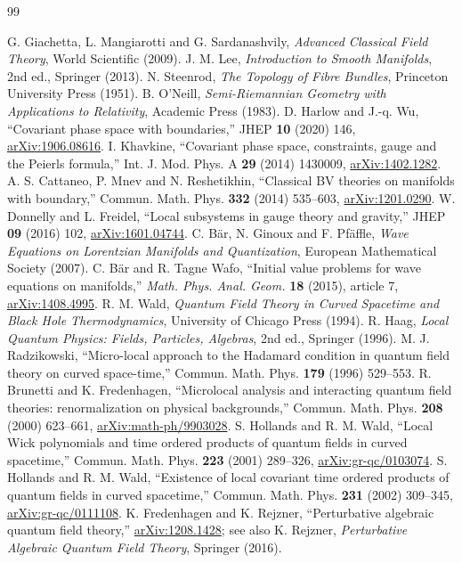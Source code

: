 \renewcommand{\bibname}{References}
\begin{thebibliography}{99}
 G. Giachetta, L. Mangiarotti and G. Sardanashvily, \emph{Advanced Classical Field Theory}, World Scientific (2009).
 J. M. Lee, \emph{Introduction to Smooth Manifolds}, 2nd ed., Springer (2013).
 N. Steenrod, \emph{The Topology of Fibre Bundles}, Princeton University Press (1951).
 B. O'Neill, \emph{Semi-Riemannian Geometry with Applications to Relativity}, Academic Press (1983).
 D. Harlow and J.-q. Wu, ``Covariant phase space with boundaries,'' JHEP \textbf{10} (2020) 146, \href{https://arxiv.org/abs/1906.08616}{arXiv:1906.08616}.
 I. Khavkine, ``Covariant phase space, constraints, gauge and the Peierls formula,'' Int. J. Mod. Phys. A \textbf{29} (2014) 1430009, \href{https://arxiv.org/abs/1402.1282}{arXiv:1402.1282}.
 A. S. Cattaneo, P. Mnev and N. Reshetikhin, ``Classical BV theories on manifolds with boundary,'' Commun. Math. Phys. \textbf{332} (2014) 535--603, \href{https://arxiv.org/abs/1201.0290}{arXiv:1201.0290}.
 W. Donnelly and L. Freidel, ``Local subsystems in gauge theory and gravity,'' JHEP \textbf{09} (2016) 102, \href{https://arxiv.org/abs/1601.04744}{arXiv:1601.04744}.
 C. B\"ar, N. Ginoux and F. Pf\"affle, \emph{Wave Equations on Lorentzian Manifolds and Quantization}, European Mathematical Society (2007).
 C. B\"ar and R. Tagne Wafo, ``Initial value problems for wave equations on manifolds,'' \emph{Math. Phys. Anal. Geom.} \textbf{18} (2015), article 7, \href{https://arxiv.org/abs/1408.4995}{arXiv:1408.4995}.
 R. M. Wald, \emph{Quantum Field Theory in Curved Spacetime and Black Hole Thermodynamics}, University of Chicago Press (1994).
 R. Haag, \emph{Local Quantum Physics: Fields, Particles, Algebras}, 2nd ed., Springer (1996).
 M. J. Radzikowski, ``Micro-local approach to the Hadamard condition in quantum field theory on curved space-time,'' Commun. Math. Phys. \textbf{179} (1996) 529--553.
 R. Brunetti and K. Fredenhagen, ``Microlocal analysis and interacting quantum field theories: renormalization on physical backgrounds,'' Commun. Math. Phys. \textbf{208} (2000) 623--661, \href{https://arxiv.org/abs/math-ph/9903028}{arXiv:math-ph/9903028}.
 S. Hollands and R. M. Wald, ``Local Wick polynomials and time ordered products of quantum fields in curved spacetime,'' Commun. Math. Phys. \textbf{223} (2001) 289--326, \href{https://arxiv.org/abs/gr-qc/0103074}{arXiv:gr-qc/0103074}.
 S. Hollands and R. M. Wald, ``Existence of local covariant time ordered products of quantum fields in curved spacetime,'' Commun. Math. Phys. \textbf{231} (2002) 309--345, \href{https://arxiv.org/abs/gr-qc/0111108}{arXiv:gr-qc/0111108}.
 K. Fredenhagen and K. Rejzner, ``Perturbative algebraic quantum field theory,'' \href{https://arxiv.org/abs/1208.1428}{arXiv:1208.1428}; see also K. Rejzner, \emph{Perturbative Algebraic Quantum Field Theory}, Springer (2016).
\end{thebibliography}

